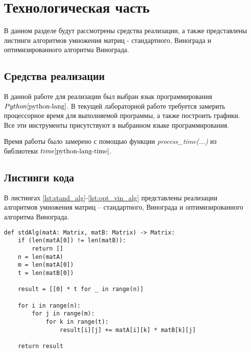 \chapter{Технологическая часть}

В данном разделе будут рассмотрены средства реализации, а также представлены листинги алгоритмов умножения матриц - стандартного, Винограда и оптимизированного алгоритма Винограда.

\section{Средства реализации}
В данной работе для реализации был выбран язык программирования $Python \cite{python-lang}$. В текущей лабораторной работе требуется замерить процессорное время для выполняемой программы, а также построить графики. Все эти инструменты присутствуют в выбранном языке программирования.

Время работы было замерено с помощью функции \textit{process\_time(...)} из библиотеки $time \cite{python-lang-time}$.


\section{Листинги кода}

В листингах \ref{lst:stand_alg}-\ref{lst:opt_vin_alg} представлены реализации алгоритмов умножения матриц -- стандартного, Винограда и оптимизированного алгоритма Винограда.

\begin{center}
    \captionsetup{justification=raggedright,singlelinecheck=off}
    \begin{lstlisting}[label=lst:stand_alg,caption=Стандартный алгоритм умножения матриц]
def stdAlg(matA: Matrix, matB: Matrix) -> Matrix:
	if (len(matA[0]) != len(matB)):
		return []
	n = len(matA)
	m = len(matA[0])
	t = len(matB[0])
	
	result = [[0] * t for _ in range(n)]
	
	for i in range(n):
		for j in range(m):
			for k in range(t):
				result[i][j] += matA[i][k] * matB[k][j]
	
	return result
\end{lstlisting}
\end{center}


